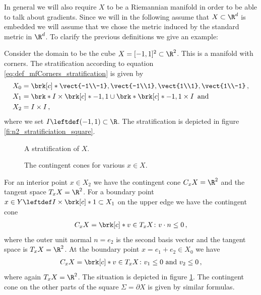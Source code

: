 In general we will also require $X$ to be a Riemannian manifold in order to be able to talk about
gradients.
Since we will in the following assume that $X\subset\R^d$ is embedded we will assume that
we chose the metric induced by the standard metric in $\R^d$.
%
To clarify the previous definitions we give an example:
\begin{example}
  Consider the domain to be the cube $X=[-1,1]^2\subset\R^2$.
  This is a manifold with corners.
  The stratification according to equation \eqref{eq:def_mfCorners_stratification} is given by
  \begin{equation*}
    \begin{aligned}
    X_0&=\brk[c]*{\vect{-1\\-1},\vect{-1\\1},\vect{1\\1},\vect{1\\-1}}\,,\\
    X_1&=\brk*{I\times\brk[c]*{-1,1}}\cup\brk*{ \brk[c]*{-1,1}\times I}\,\text{ and}\\
    X_2&=I\times I\,,
    \end{aligned}
  \end{equation*}
  where we set $I\leftdef(-1,1)\subset\R$.
  The stratification is depicted in figure \ref{fi:n2_stratificiation_square}.
  \begin{figure}
    \centering
    \begin{minipage}[h]{0.35\textwidth}
      
      \caption{A stratification of $X$.}
      \label{fi:n2_stratificiation_square}
    \end{minipage}
    \hfill
    \begin{minipage}[h]{0.6\textwidth}
      
      \caption{The contingent cones for various $x\in X$.}
      \label{fi:n2_tangencyCone_square}
    \end{minipage}
  \end{figure}
  For an interior point $x\in X_2$ we have 
  the contingent cone $C_xX=\R^2$ and the tangent space $T_xX=\R^2$.
  For a boundary point $x\in Y\leftdef I\times \brk[c]*{1}\subset X_1$ on the upper edge we have the contingent cone
  \begin{align}
    C_xX=\brk[c]*{v\in T_xX\colon v\cdot n\leq 0}\label{eq:n2_cube_boundaryPt}\,,
  \end{align}
  where the outer unit normal $n=e_2$ is the second basis vector and the 
  tangent space is $T_xX=\R^2$. At the boundary point $x=e_1+e_2\in X_0$ we have
  \begin{align}
    C_xX=\brk[c]*{v\in T_xX\colon v_1\leq0\text{ and }v_2\leq 0}\label{eq:n2_cube_cornerPt}\,,
  \end{align}
  where again $T_xX=\R^2$.
  The situation is depicted in figure \ref{fi:n2_tangencyCone_square}.
  The contingent cone on the other parts of the square $\Sigma=\partial X$ is given by similar formulas.
\end{example}


